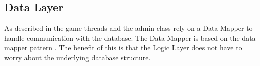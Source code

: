 





\subsection{Data Layer}
As described in  the game threads and the admin class rely on a Data Mapper to handle communication with the database. The Data Mapper is based on the data mapper pattern \cite{fowler}. The benefit of this is that the Logic Layer does not have to worry about the underlying database structure.

